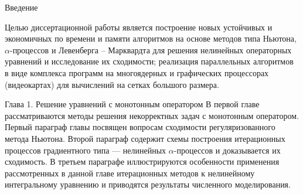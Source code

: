 \documentclass[10pt,pdf, mathserif, hyperref={unicode}]{beamer}
\begin{document}
\begin{frame}{Введение}
	
	\begin{block}{}
		Целью диссертационной работы является построение новых устойчивых и экономичных по времени и памяти алгоритмов на основе методов типа Ньютона, $\alpha$-процессов и Левенберга -- Марквардта для решения нелинейных операторных уравнений и исследование их сходимости; реализация параллельных алгоритмов в виде комплекса программ на многоядерных и графических процессорах (видеокартах) для вычислений на сетках большого размера.
	\end{block}
\end{frame}
%	
\begin{frame}{Глава 1. Решение уравнений с монотонным оператором}
	В первой главе рассматриваются методы решения некорректных задач с монотонным оператором. Первый параграф главы посвящен вопросам сходимости регуляризованного метода Ньютона. Второй параграф содержит схемы построения итерационных процессов градиентного типа --- нелинейных $\alpha$-процессов и доказывается их сходимость. В третьем параграфе иллюстрируются особенности применения рассмотренных в данной главе итерационных методов к нелинейному интегральному уравнению и приводятся результаты численного моделирования.
\end{frame}
\end{document}
